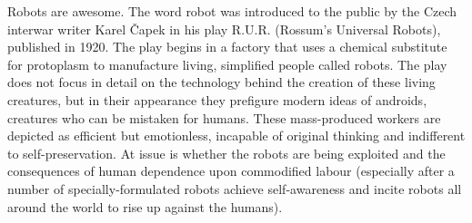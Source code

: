 \setlength{\parskip}{1em}
\setlength{\parindent}{0em}

\noindent
Robots are awesome. The word robot was introduced to the public by the Czech
interwar writer Karel Čapek in his play R.U.R. (Rossum's Universal Robots),
published in 1920. The play begins in a factory that uses a chemical substitute
for protoplasm to manufacture living, simplified people called robots. The play
does not focus in detail on the technology behind the creation of these living
creatures, but in their appearance they prefigure modern ideas of androids,
creatures who can be mistaken for humans. These mass-produced workers are
depicted as efficient but emotionless, incapable of original thinking and
indifferent to self-preservation. At issue is whether the robots are being
exploited and the consequences of human dependence upon commodified labour
(especially after a number of specially-formulated robots achieve
self-awareness and incite robots all around the world to rise up against the
humans).
